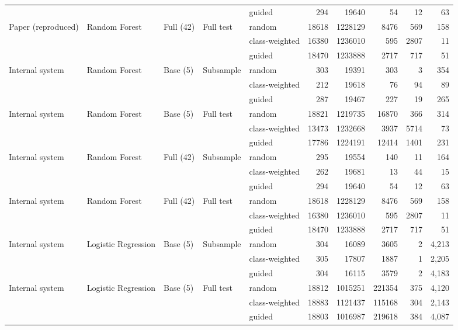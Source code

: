 \begin{longtable}{lllllrrrrr}
 &  &  &  & guided & 294 & 19640 & 54 & 12 & 63 \\
\addlinespace
Paper (reproduced) & Random Forest & Full (42) & Full test & random & 18618 & 1228129 & 8476 & 569 & 158 \\
 &  &  &  & class-weighted & 16380 & 1236010 & 595 & 2807 & 11 \\
 &  &  &  & guided & 18470 & 1233888 & 2717 & 717 & 51 \\
\midrule
Internal system & Random Forest & Base (5) & Subsample & random & 303 & 19391 & 303 & 3 & 354 \\
 &  &  &  & class-weighted & 212 & 19618 & 76 & 94 & 89 \\
 &  &  &  & guided & 287 & 19467 & 227 & 19 & 265 \\
\addlinespace
Internal system & Random Forest & Base (5) & Full test & random & 18821 & 1219735 & 16870 & 366 & 314 \\
 &  &  &  & class-weighted & 13473 & 1232668 & 3937 & 5714 & 73 \\
 &  &  &  & guided & 17786 & 1224191 & 12414 & 1401 & 231 \\
\addlinespace
Internal system & Random Forest & Full (42) & Subsample & random & 295 & 19554 & 140 & 11 & 164 \\
 &  &  &  & class-weighted & 262 & 19681 & 13 & 44 & 15 \\
 &  &  &  & guided & 294 & 19640 & 54 & 12 & 63 \\
\addlinespace
Internal system & Random Forest & Full (42) & Full test & random & 18618 & 1228129 & 8476 & 569 & 158 \\
 &  &  &  & class-weighted & 16380 & 1236010 & 595 & 2807 & 11 \\
 &  &  &  & guided & 18470 & 1233888 & 2717 & 717 & 51 \\
\addlinespace
Internal system & Logistic Regression & Base (5) & Subsample & random & 304 & 16089 & 3605 & 2 & 4,213 \\
 &  &  &  & class-weighted & 305 & 17807 & 1887 & 1 & 2,205 \\
 &  &  &  & guided & 304 & 16115 & 3579 & 2 & 4,183 \\
\addlinespace
Internal system & Logistic Regression & Base (5) & Full test & random & 18812 & 1015251 & 221354 & 375 & 4,120 \\
 &  &  &  & class-weighted & 18883 & 1121437 & 115168 & 304 & 2,143 \\
 &  &  &  & guided & 18803 & 1016987 & 219618 & 384 & 4,087 \\

\end{longtable}
